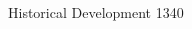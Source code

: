 \documentclass[final,cmyk]{beamer}
\begin{document}
\begin{frame}[t]
\begin{minipage}[t][.3\textheight][t]{\textwidth}
\begin{columns}
\begin{column}{.6\textwidth}
\begin{block}{Historical Development 1340}
		  \end{block}
		\end{column}

		\begin{column}{.3\textwidth}

		\end{column}

\end{columns}
\end{minipage}

\end{frame} %
\end{document}
